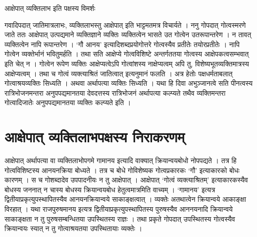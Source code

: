 आक्षेपात् व्यक्तिलाभ इति पक्षस्य विमर्शः

गवादिपदात् जातिमात्रलाभः, व्यक्तिलाभस्तु आक्षेपात् इति भाट्टमतमत्र विचार्यते । ननु गोपदात् गोत्वस्मरणे जाते ततः आक्षेपात् उत्पद्यमाने व्यक्तिज्ञाने व्यक्तिः व्यक्तित्वेन भासते उत गोत्वेन उतरूपान्तरेण । न तावत् व्यक्तित्वेन नापि रूपान्तरेण । ‘गौ आनय’ इत्यादिशब्दप्रयोगोत्तरे गोत्वस्यैव प्रतीतेः तयोरप्रतीतेः । नापि गोत्वेन व्यक्तेर्भानं भवितुमर्हति । तथा सति आक्षेप्ये गोत्वविशिष्टे अन्तर्गततया गोत्वस्य आक्षेपकत्वसम्भवात् इति चेत् न । गोत्वेन रूपेण व्यक्तिः आक्षेप्यत्वेऽपि गोत्वांशस्य नाक्षेप्यत्वम् अपि तु, विशेष्यभूतव्यक्तिमात्रस्य आक्षेप्यत्वम् । तथा च गोत्वं व्यक्त्याश्रितं जातित्वात् इत्यनुमानं फलति । अत्र हेतोः पक्षधर्मताबलात् गोत्वाश्रयव्यक्तिः सिध्यति । अथवा अर्थापत्या व्यक्तिः सिध्यति । यथा हि दिवा अभुञ्जानत्वे सति पीनत्वस्य रात्रिभोजनमन्तरा अनुपपद्यमानतया देवदत्तस्य रात्रिभोजनं अर्थापत्या कल्प्यते तथैव व्यक्तिमन्तरा गोत्वादिजातेः अनुपपद्यमानतया व्यक्तिः कल्प्यते इति । 

\section*{आक्षेपात् व्यक्तिलाभपक्षस्य निराकरणम्} 

आक्षेपात् अर्थापत्या वा व्यक्तिलाभोपगमे गामानय इत्यादि वाक्यात् क्रियान्वयबोधो नोपपद्यते । तत्र हि गोत्वविशिष्टस्य आनयनक्रिया बोध्यते । तत्र च बोधे गोविशेष्यक गोत्वप्रकारकः ‘गौ’ इत्याकारको बोधः कारणम् । स च गोशब्दादेव उपपादनीयः न तु आक्षेपात् । आक्षेपात् ‘गोत्वं व्यक्त्याश्रितम्’ इत्याकारकस्यैव बोधस्य जननात्  न चास्य बोधस्य क्रियान्वयबोध हेतुत्वमात्रमिति वाच्यम् । ‘गामानय’ इत्यत्र द्वितीयाप्रकृत्युपस्थापितस्यैव आनयनक्रियान्वये साकाङ्क्षत्वात् । व्यक्तेः अतथात्वेन क्रियान्वये आकाङ्क्षा विरहात् । यथा राजपुरुषमानय इत्यत्र द्वितीयाप्रकृत्युपस्थापितस्य पुरुषस्यैव आननयनादि क्रियान्वये साकाङ्क्षता न तु पुरुषसम्बन्धितया उपस्थितस्य राज्ञः । तथा प्रकृते गोपदात् उपस्थितस्य गोत्वस्यैव क्रियान्वयः स्यात् न तु गोत्वाश्रयतया उपस्थितायाः व्यक्तेः ।

